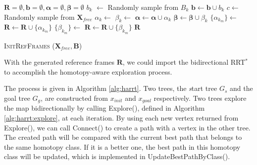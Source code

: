 \documentclass[letterpaper, 10 pt, conference]{ieeeconf}
\begin{document}

\begin{algorithm}[hbtp]
	\begin{algorithmic}[1]
		\State $ \bm{R} = \emptyset, \bm{b} = \emptyset, \bm{\alpha} = \emptyset, \bm{\beta} = \emptyset $
			\State $ b_{k} $ $ \leftarrow $ Randomly sample from $ B_{k} $
			\State $ \bm{b} \leftarrow \bm{b} \cup b_{k} $
		\EndFor
			\State $ c \leftarrow  $ Randomly sample from $ \bm{X}_{free} $
		\EndWhile
			\State $ \alpha_{k} \leftarrow $ 
			\State $ \beta_{k} \leftarrow $ 
			\State $ \bm{\alpha} \leftarrow \bm{\alpha} \cup \alpha_{k} $
			\State $ \bm{\beta} \leftarrow \bm{\beta} \cup \beta_{k} $			
		\EndFor
			\State $ \{ \alpha_{k_{m}} \} \leftarrow $ 
			\State $ \bm{R} \leftarrow \bm{R} \cup \{ \alpha_{k_{m}} \} $
		\EndFor
			\State $ \{ \beta_{k_{m}} \} \leftarrow $ 
			\State $ \bm{R} \leftarrow \bm{R} \cup \{ \beta_{k_{m}} \} $
		\EndFor
		\Return $ \bm{R} $
	\end{algorithmic}
	\caption{ \textsc{InitRefFrames} ($ \bm{X}_{free} , \bm{B} $) }
	\label{alg:harrt:init_ref_frames}
\end{algorithm} 

With the generated reference frames $ \mathbf{R} $, we could import the bidirectional RRT$^{*}$ to accomplish the homotopy-aware exploration process. 



The process is given in Algorithm \ref{alg:harrt}.
Two trees, the {\emph start tree} $ G_{s} $ and the {\sc goal tree} $ G_{g} $, are constructed from $ x_{init} $ and $ x_{goal} $ respectively.
Two trees explore the map bidirectionally by calling {\sc Explore}(), defined in Algorithm \ref{alg:harrt:explore}, at each iteration.
By using each new vertex returned from {\sc Explore}(), we can call {\sc Connect}() to create a path with a vertex in the other tree.
The created path will be compared with the current best path that belongs to the same homotopy class.
If it is a better one, the best path in this homotopy class will be updated, which is implemented in {\sc UpdateBestPathByClass}().
\end{document}
